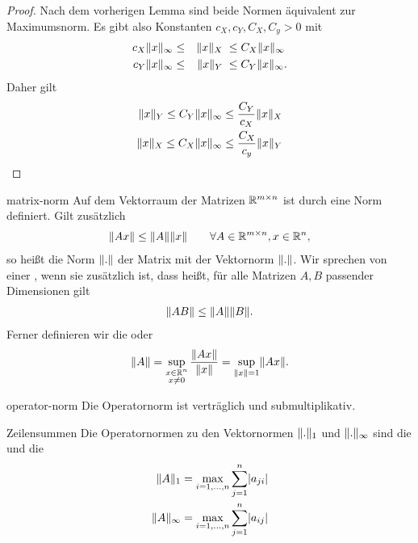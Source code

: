 \begin{proof}
  Nach dem vorherigen Lemma sind beide Normen äquivalent zur Maximumsnorm. Es gibt also Konstanten $c_X, c_Y, C_X, C_y>0$ mit
  \begin{gather}
    \begin{aligned}
     c_X \lVert x\rVert_\infty &\le &\lVert x\rVert_X \;&\le C_X \lVert x\rVert_\infty\\
     c_Y \lVert x\rVert_\infty &\le &\lVert x\rVert_Y \;&\le C_Y \lVert x\rVert_\infty.
    \end{aligned}
  \end{gather}
  Daher gilt
  \begin{gather}
    \begin{split}
      \lVert x\rVert_Y \le C_Y\lVert x\rVert_\infty &\le \frac{C_Y}{c_X} \lVert x\rVert_X\\
      \lVert x\rVert_X \le C_X\lVert x\rVert_\infty &\le \frac{C_X}{c_y} \lVert x\rVert_Y
    \end{split}
  \end{gather}
\end{proof}


\begin{Definition}{matrix-norm}
  Auf dem Vektorraum der Matrizen $\mathbb R^{m\times n}$ ist durch
   eine Norm definiert. Gilt zusätzlich
  \begin{gather}
    \lVert Ax\rVert \le \lVert A\rVert\lVert x\rVert
    \qquad\forall A\in \mathbb R^{m\times n}, x\in \mathbb R^n,
  \end{gather}
  so heißt die Norm $\lVert.\rVert$ der Matrix  mit der
  Vektornorm $\lVert.\rVert$. Wir sprechen von einer ,
  wenn sie zusätzlich  ist, dass heißt,
  für alle Matrizen $A,B$ passender Dimensionen gilt
  \begin{gather}
    \lVert AB\rVert \le \lVert A\rVert\lVert B\rVert.
  \end{gather}
  Ferner definieren wir die  oder 
  \begin{gather}
    \lVert A\rVert = \sup_{\substack{x\in\mathbb R^n\\x\neq0}} \frac{\lVert Ax\rVert}{\lVert x\rVert}
    = \sup_{\lVert x\rVert=1}\lVert Ax\rVert.
  \end{gather}
\end{Definition}

\begin{Lemma}{operator-norm}
  Die Operatornorm ist verträglich und submultiplikativ.
\end{Lemma}

\begin{Beispiel}{Zeilensummen}
  Die Operatornormen zu den Vektornormen $\lVert.\rVert_1$ und
  $\lVert.\rVert_\infty$ sind die  und die
  \begin{align}
    \lVert A\rVert_1 &= \max_{i=1,\dots,n} \sum_{j=1}^n \lvert a_{ji}\rvert\\
    \lVert A\rVert_\infty &= \max_{i=1,\dots,n} \sum_{j=1}^n \lvert a_{ij}\rvert
  \end{align}
\end{Beispiel}

